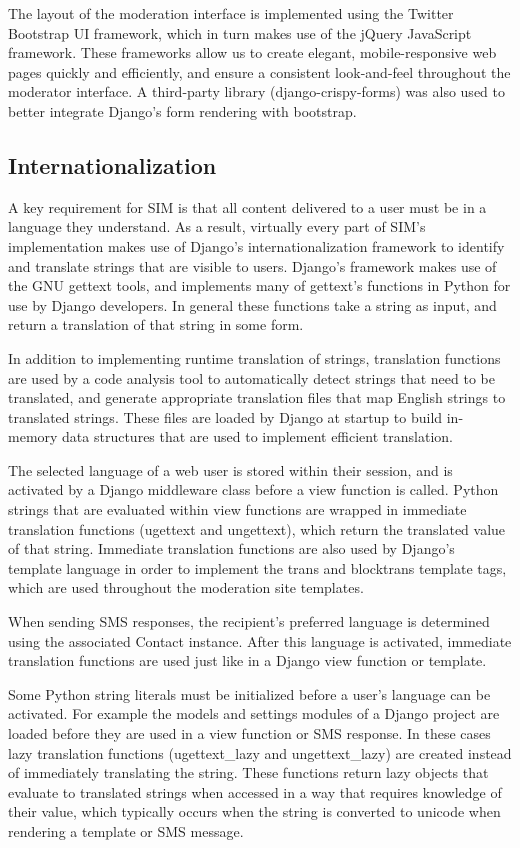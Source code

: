 \documentclass{acm_proc_article-sp}
\begin{document}
The layout of the moderation interface is implemented using the Twitter Bootstrap UI framework, which in turn makes use of the jQuery JavaScript framework. These frameworks allow us to create elegant, mobile-responsive web pages quickly and efficiently, and ensure a consistent look-and-feel throughout the moderator interface. A third-party library (django-crispy-forms) was also used to better integrate Django’s form rendering with bootstrap.

\subsection{Internationalization}

A key requirement for SIM is that all content delivered to a user must be in a language they understand. As a result, virtually every part of SIM’s implementation makes use of Django’s internationalization framework to identify and translate strings that are visible to users. Django’s framework makes use of the GNU gettext tools, and implements many of gettext’s functions in Python for use by Django developers. In general these functions take a string as input, and return a translation of that string in some form.

In addition to implementing runtime translation of strings, translation functions are used by a code analysis tool to automatically detect strings that need to be translated, and generate appropriate translation files that map English strings to translated strings. These files are loaded by Django at startup to build in-memory data structures that are used to implement efficient translation.

The selected language of a web user is stored within their session, and is activated by a Django middleware class before a view function is called. Python strings that are evaluated within view functions are wrapped in immediate translation functions (ugettext and ungettext), which return the translated value of that string. Immediate translation functions are also used by Django’s template language in order to implement the trans and blocktrans template tags, which are used throughout the moderation site templates.

When sending SMS responses, the recipient’s preferred language is determined using the associated Contact instance. After this language is activated, immediate translation functions are used just like in a Django view function or template.

Some Python string literals must be initialized before a user’s language can be activated. For example the models and settings modules of a Django project are loaded before they are used in a view function or SMS response. In these cases lazy translation functions (ugettext\_lazy and ungettext\_lazy) are created instead of immediately translating the string. These functions return lazy objects that evaluate to translated strings when accessed in a way that requires knowledge of their value, which typically occurs when the string is converted to unicode when rendering a template or SMS message.
\end{document}
